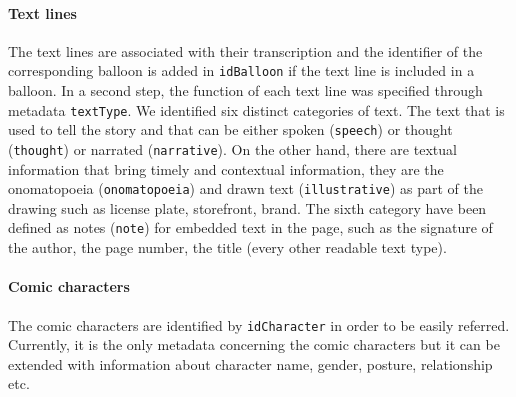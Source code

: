 \paragraph{Text lines}
The text lines are associated with their transcription and the identifier of the corresponding balloon is added in \texttt{{idBalloon}} if the text line is included in a balloon.
In a second step, the function of each text line was specified through metadata \texttt{textType}. 
We identified six distinct categories of text.
The text that is used to tell the story and that can be either spoken (\texttt{speech}) or thought (\texttt{thought}) or narrated (\texttt{narrative}).
On the other hand, there are textual information that bring timely and contextual information, they are the onomatopoeia (\texttt{onomatopoeia}) and drawn text (\texttt{illustrative}) as part of the drawing such as license plate, storefront, brand.
The sixth category have been defined as notes (\texttt{note}) for embedded text in the page, such as the signature of the author, the page number, the title (every other readable text type).

\paragraph{Comic characters} %
\label{par:comic_characters}
The comic characters are identified by \texttt{{idCharacter}} in order to be easily referred.
Currently, it is the only metadata concerning the comic characters but it can be extended with information about character name, gender, posture, relationship etc.




